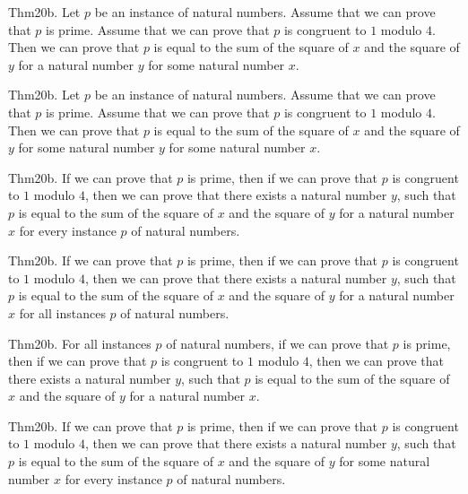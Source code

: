 \documentclass{article}
\begin{document}
Thm20b. Let $p$ be an instance of natural numbers. Assume that we can prove that $p$ is prime. Assume that we can prove that $p$ is congruent to $1$ modulo $4$. Then we can prove that $p$ is equal to the sum of the square of $x$ and the square of $y$ for a natural number $y$ for some natural number $x$.

Thm20b. Let $p$ be an instance of natural numbers. Assume that we can prove that $p$ is prime. Assume that we can prove that $p$ is congruent to $1$ modulo $4$. Then we can prove that $p$ is equal to the sum of the square of $x$ and the square of $y$ for some natural number $y$ for some natural number $x$.

Thm20b. If we can prove that $p$ is prime, then if we can prove that $p$ is congruent to $1$ modulo $4$, then we can prove that there exists a natural number $y$, such that $p$ is equal to the sum of the square of $x$ and the square of $y$ for a natural number $x$ for every instance $p$ of natural numbers.

Thm20b. If we can prove that $p$ is prime, then if we can prove that $p$ is congruent to $1$ modulo $4$, then we can prove that there exists a natural number $y$, such that $p$ is equal to the sum of the square of $x$ and the square of $y$ for a natural number $x$ for all instances $p$ of natural numbers.

Thm20b. For all instances $p$ of natural numbers, if we can prove that $p$ is prime, then if we can prove that $p$ is congruent to $1$ modulo $4$, then we can prove that there exists a natural number $y$, such that $p$ is equal to the sum of the square of $x$ and the square of $y$ for a natural number $x$.

Thm20b. If we can prove that $p$ is prime, then if we can prove that $p$ is congruent to $1$ modulo $4$, then we can prove that there exists a natural number $y$, such that $p$ is equal to the sum of the square of $x$ and the square of $y$ for some natural number $x$ for every instance $p$ of natural numbers.
\end{document}
